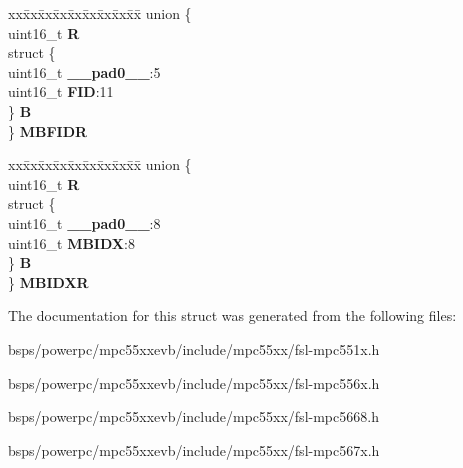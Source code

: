 \begin{DoxyCompactItemize}
\begin{tabbing}
\end{tabbing}\item 
\mbox{\label{structuMSG__BUFF__CCS_a81a30cec2cfb2cb07cb4d1e750760804}} 
\begin{tabbing}
xx\=xx\=xx\=xx\=xx\=xx\=xx\=xx\=xx\=\kill
union \{\\
\>uint16\_t {\bfseries R}\\
\>struct \{\\
\>\>uint16\_t {\bfseries \_\_pad0\_\_}:5\\
\>\>uint16\_t {\bfseries FID}:11\\
\>\} {\bfseries B}\\
\} {\bfseries MBFIDR}\\

\end{tabbing}\item 
\mbox{\label{structuMSG__BUFF__CCS_a51a5227cbd1ec84ba3de93a62d78e471}} 
\begin{tabbing}
xx\=xx\=xx\=xx\=xx\=xx\=xx\=xx\=xx\=\kill
union \{\\
\>uint16\_t {\bfseries R}\\
\>struct \{\\
\>\>uint16\_t {\bfseries \_\_pad0\_\_}:8\\
\>\>uint16\_t {\bfseries MBIDX}:8\\
\>\} {\bfseries B}\\
\} {\bfseries MBIDXR}\\

\end{tabbing}\end{DoxyCompactItemize}


The documentation for this struct was generated from the following files\+:\begin{DoxyCompactItemize}
\item 
bsps/powerpc/mpc55xxevb/include/mpc55xx/fsl-\/mpc551x.\+h\item 
bsps/powerpc/mpc55xxevb/include/mpc55xx/fsl-\/mpc556x.\+h\item 
bsps/powerpc/mpc55xxevb/include/mpc55xx/fsl-\/mpc5668.\+h\item 
bsps/powerpc/mpc55xxevb/include/mpc55xx/fsl-\/mpc567x.\+h\end{DoxyCompactItemize}
